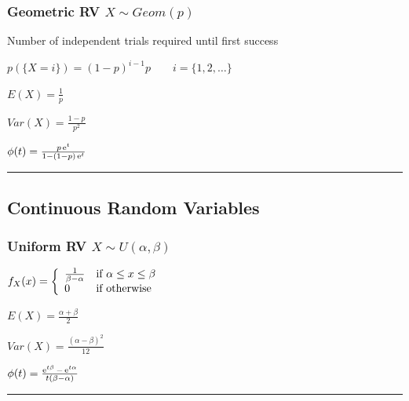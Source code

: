 \subsubsection{Geometric RV $X\sim Geom(p)$ }

\begin{minipage}{10cm}
	\begin{liste}
		\item Number of independent trials required until first success
		\vspace{0.2cm}
		\item $\boxed{p(\{X=i\}) = (1-p)^{i-1}p\qquad i=\{1,2,\ldots\}}$
	\end{liste}
\end{minipage}
\hfill
\begin{minipage}{8cm}
	\begin{liste}
		\item $E(X)=\frac 1p$
		\item $Var(X)=\frac {1-p}{p^2}$
		\item $\phi(t)=\frac{p\operatorname{\mathrm e}^t}{1-(1-p)\operatorname{\mathrm e}^t}$
	\end{liste}
\end{minipage}
\hfill

\vspace{2mm}
\hrule
\vspace{3mm}

\subsection{Continuous Random Variables }
\subsubsection{Uniform RV $X\sim U(\alpha,\beta)$ }
\begin{minipage}{10cm}
$f_X(x) = \left\{ \begin{array}{ll}  \frac{1}{\beta-\alpha}  & \mbox{if } \alpha \leq x \leq\beta \\ 0 & \mbox{if } \text{otherwise} \end{array} \right.$
\end{minipage}
\begin{minipage}{10cm}
	\begin{liste}
		\item $E(X)=\frac {\alpha+\beta}{2}$
		\item $Var(X)=\frac {(\alpha-\beta)^2}{12}$
		\item $\phi(t)=\frac{\operatorname{\mathrm e}^{t\beta}-\operatorname{\mathrm e}^{t\alpha}}{t(\beta-\alpha)}$
	\end{liste}
\end{minipage}
\hfill
\vspace{2mm}
\hrule
\vspace{3mm}

